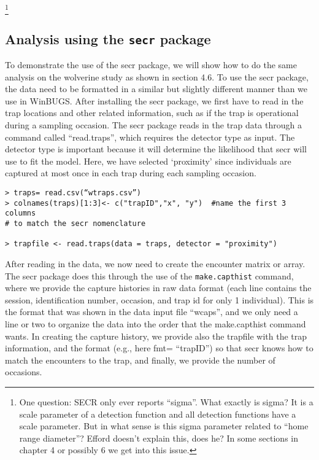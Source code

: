 \footnote{One question: SECR only ever reports “sigma”. What exactly is sigma?  It is a scale parameter of a detection function and all detection functions have a scale parameter. But in what sense is this sigma parameter related to “home range diameter”?  Efford doesn’t explain this, does he?  In some sections in chapter 4 or possibly 6 we get into this issue. 
}

\subsection{ Analysis using the \mbox{\tt secr} package}

To demonstrate the use of the secr package, we will show how to do the
same analysis on the wolverine study as shown in section 4.6.  To use
the secr package, the data need to be formatted in a similar but
slightly different manner than we use in WinBUGS.  After installing
the secr package, we first have to read in the trap locations and
other related information, such as if the trap is operational during a
sampling occasion.  The secr package reads in the trap data through a
command called “read.traps”, which requires the detector type as
input.  The detector type is important because it will determine the
likelihood that secr will use to fit the model.  Here, we have
selected ‘proximity’ since individuals are captured at most once in
each trap during each sampling occasion.

\begin{verbatim}
> traps= read.csv(“wtraps.csv”)
> colnames(traps)[1:3]<- c("trapID","x", "y")  #name the first 3 columns 
# to match the secr nomenclature

> trapfile <- read.traps(data = traps, detector = "proximity")
\end{verbatim}

After reading in the data, we now need to create the encounter matrix
or array.  The secr package does this through the use of the
\mbox{\tt make.capthist} command, where we provide the capture histories in raw
data format (each line contains the session, identification number,
occasion, and trap id for only 1 individual).  This is the format that
was shown in the data input file “wcaps”, and we only need a line or
two to organize the data into the order that the make.capthist command
wants.  In creating the capture history, we provide also the trapfile
with the trap information, and the format (e.g., here fmt= “trapID”)
so that secr knows how to match the encounters to the trap, and
finally, we provide the number of occasions.

